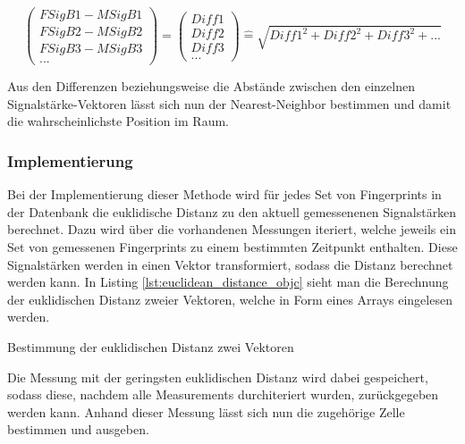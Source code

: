 \begin{equation}
	\begin{pmatrix}
		FSigB1 - MSigB1 \\
		FSigB2 - MSigB2 \\
		FSigB3 - MSigB3 \\
		...
	\end{pmatrix}
	=
	\begin{pmatrix}
		Diff1 \\
		Diff2 \\
		Diff3 \\
		...
	\end{pmatrix}
	\widehat{=}
	\sqrt{Diff1^2 + Diff2^2 + Diff3^2 + ...}
\end{equation}

Aus den Differenzen beziehungsweise die Abstände zwischen den einzelnen Signalstärke-Vektoren lässt sich nun der Nearest-Neighbor bestimmen und damit die wahrscheinlichste Position im Raum.


\subsubsection{Implementierung}
\label{sec:implementation:fingerprinting:positioning:naiv:implementation}
Bei der Implementierung dieser Methode wird für jedes Set von Fingerprints in der Datenbank die euklidische Distanz zu den aktuell gemessenenen Signalstärken berechnet. Dazu wird über die vorhandenen Messungen iteriert, welche jeweils ein Set von gemessenen Fingerprints zu einem bestimmten Zeitpunkt enthalten. Diese Signalstärken werden in einen Vektor transformiert, sodass die Distanz berechnet werden kann. In Listing \ref{lst:euclidean_distance_objc} sieht man die Berechnung der euklidischen Distanz zweier Vektoren, welche in Form eines Arrays eingelesen werden.

\begin{listing}[htb!]
    \caption{Bestimmung der euklidischen Distanz zwei Vektoren}
	\label{lst:euclidean_distance_objc}
\end{listing}

Die Messung mit der geringsten euklidischen Distanz wird dabei gespeichert, sodass diese, nachdem alle Measurements durchiteriert wurden, zurückgegeben werden kann. Anhand dieser Messung lässt sich nun die zugehörige Zelle bestimmen und ausgeben.

